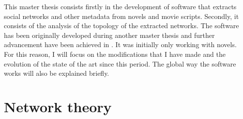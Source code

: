 \documentclass[a4paper, 12pt]{report}
\begin{document}
This master thesis consists firstly in the development of software that extracts social networks and other metadata from novels and movie scripts. Secondly, it consists of the analysis of the topology of the extracted networks. The software has been originally developed during another master thesis \citep{original_thesis} and further advancement have been achieved in \cite{original}. It was initially only working with novels. For this reason, I will focus on the modifications that I have made and the evolution of the state of the art since this period. The global way the software works will also be explained briefly. \\


\chapter{Network theory}
\begin{table}
\center
{}
\caption{Example of social networks \citep{SNA_Overview}}\label{SNA_Exemple}
\end{table}
\end{document}
